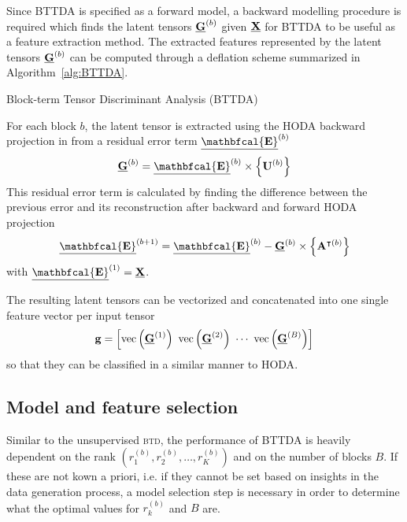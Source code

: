 \documentclass[twocolumn]{article}
\begin{document}
Since \textsc{BTTDA} is specified as a forward model, a backward modelling
procedure is required which finds the latent tensors $\underline{\mathbf{G}}^{(b)}$ given $\underline{\mathbf{X}}$ for
\textsc{BTTDA} to be useful as a feature extraction method.
The extracted features represented by the latent tensors $\underline{\mathbf{G}}^{(b)}$ can be
computed through a deflation scheme summarized in Algorithm~\ref{alg:BTTDA}.
\begin{algorithm}
	\caption{Block-term Tensor Discriminant Analysis (\textsc{BTTDA})}
	\label{alg:BTTDA}
	
\end{algorithm}
For each block $b$, the latent tensor is extracted using the \textsc{HODA} backward
projection in from a residual error term
$\ten{\mathbfcal{E}}^{(b)}$
\begin{equation}
	\ten{G}^{(b)} = \ten{\mathbfcal{E}}^{(b)}\mmpr{\mat{U}^{(b)}}
\end{equation}
This residual error term is calculated by finding the difference between the
previous error and its reconstruction after backward and forward \textsc{HODA}
projection
\begin{equation}
	\ten{\mathbfcal{E}}^{(b+1)} = \ten{\mathbfcal{E}}^{(b)} - \ten{G}^{(b)}
	\mmpr{\mat{A}^{\intercal(b)}}
\end{equation}
with $\ten{\mathbfcal{E}}^{(1)}=\ten{X}$.

The resulting latent tensors can be vectorized and concatenated into
one single feature vector per input tensor
\begin{equation}
	\mathbf{g}
	=\left[\operatorname{vec}\left(\underline{\mathbf{G}}^{(1)}\right)\
		\operatorname{vec}\left(\underline{\mathbf{G}}^{(2)}\right)\
		\cdots\
		\operatorname{vec}\left(\underline{\mathbf{G}}^{(B)}\right)\right]
\end{equation}
so that they can be classified in a similar manner to \textsc{HODA}.


\subsection{Model and feature selection}
Similar to the unsupervised \textsc{btd}, the performance of \textsc{BTTDA} is
heavily dependent on the rank $(r_1^{(b)}, r_2^{(b)}, \ldots,
	r_K^{(b)})$ and on the number of blocks $B$.
If these are not kown a priori, i.e. if they cannot be set based on insights in the
data generation process, a model selection step is necessary in order to
determine what the optimal values for $r_k^{(b)}$ and $B$ are.
\end{document}
